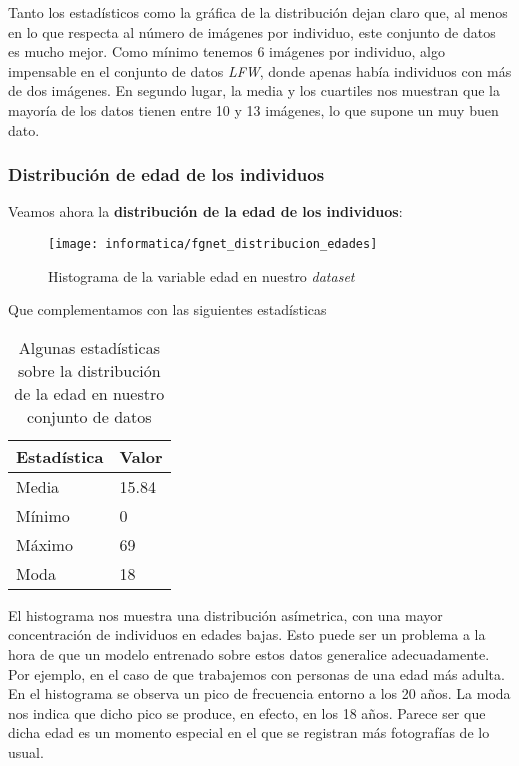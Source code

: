 Tanto los estadísticos como la gráfica de la distribución dejan claro que, al menos en lo que respecta al número de imágenes por individuo, este conjunto de datos es mucho mejor. Como mínimo tenemos 6 imágenes por individuo, algo impensable en el conjunto de datos \textit{LFW}, donde apenas había individuos con más de dos imágenes. En segundo lugar, la media y los cuartiles nos muestran que la mayoría de los datos tienen entre 10 y 13 imágenes, lo que supone un muy buen dato.

\subsubsection{Distribución de edad de los individuos} \label{isubsubs:fgnet_dist_edades}

Veamos ahora la \textbf{distribución de la edad de los individuos}:

\begin{figure}[H]
    \centering
    \texttt{[image: informatica/fgnet\_distribucion\_edades]}
    \caption{Histograma de la variable edad en nuestro \textit{dataset}}
    \label{img:fgnet_histograma_edad}
\end{figure}

Que complementamos con las siguientes estadísticas

\begin{table}[H]
\centering
\begin{tabular}{|l|l|}
    \hline
    \textbf{Estadística} & \textbf{Valor} \\
    \hline

    Media  & 15.84 \\
    Mínimo & 0 \\
    Máximo & 69 \\
    Moda   & 18 \\

    \hline

\end{tabular}

    \caption{Algunas estadísticas sobre la distribución de la edad en nuestro conjunto de datos}
    \label{table:fgnet_estadisticas_edad}
\end{table}

El histograma  nos muestra una distribución asímetrica, con una mayor concentración de individuos en edades bajas. Esto puede ser un problema a la hora de que un modelo entrenado sobre estos datos generalice adecuadamente. Por ejemplo, en el caso de que trabajemos con personas de una edad más adulta. En el histograma se observa un pico de frecuencia entorno a los 20 años. La moda nos indica que dicho pico se produce, en efecto, en los 18 años. Parece ser que dicha edad es un momento especial en el que se registran más fotografías de lo usual.

